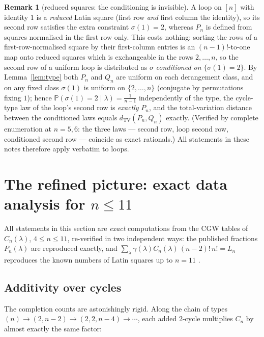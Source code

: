 \documentclass[11pt]{article}
\theoremstyle{definition}
\newtheorem{remark}[theorem]{Remark}
\newcommand{\dtv}{d_{\mathrm{TV}}}
\renewcommand{\Pr}{\mathbb{P}}
\newcommand{\PP}{P}
\newcommand{\QQ}{Q}
\newcommand{\CC}{C}
\begin{document}
\begin{remark}[reduced squares: the conditioning is invisible]
\label{rem:reduced}
A loop on $[n]$ with identity $1$ is a \emph{reduced} Latin square (first
row \emph{and} first column the identity), so its second row satisfies the
extra constraint $\sigma(1)=2$, whereas $\PP_n$ is defined from squares
normalised in the first row only.  This costs nothing: sorting the rows of
a first-row-normalised square by their first-column entries is an
$(n-1)!$-to-one map onto reduced squares which is exchangeable in the rows
$2,\dots,n$, so the second row of a uniform loop is distributed as
$\sigma$ \emph{conditioned on} $\{\sigma(1)=2\}$.  By
Lemma~\ref{lem:type} both $\PP_n$ and $\QQ_n$ are uniform on each
derangement class, and on any fixed class $\sigma(1)$ is uniform on
$\{2,\dots,n\}$ (conjugate by permutations fixing $1$); hence
$\Pr(\sigma(1)=2\mid\lambda)=\tfrac1{n-1}$ independently of the type,
the cycle-type law of the loop's second row is \emph{exactly} $\PP_n$,
and the total-variation distance between the conditioned laws equals
$\dtv(\PP_n,\QQ_n)$ exactly.  (Verified by complete enumeration at
$n=5,6$: the three laws --- second row, loop second row, conditioned
second row --- coincide as exact rationals.)  All statements in these
notes therefore apply verbatim to loops.
\end{remark}

\section{The refined picture: exact data analysis for \texorpdfstring{$n\le11$}{n<=11}}\label{sec:refined}

All statements in this section are \emph{exact} computations from the CGW
tables of $\CC_n(\lambda)$, $4\le n\le 11$, re-verified in two independent
ways: the published fractions $\PP_n(\lambda)$ are reproduced exactly, and
$\sum_\lambda \gamma(\lambda)\CC_n(\lambda)\,(n-2)!\,n! = L_n$ reproduces the
known numbers of Latin squares up to $n=11$ \cite{McKW05}.

\subsection{Additivity over cycles}\label{sec:additivity}

The completion counts are astonishingly rigid.  Along the chain of types
$(n)\to(2,n-2)\to(2,2,n-4)\to\cdots$, each added $2$-cycle multiplies
$\CC_n$ by almost exactly the same factor:
\end{document}
